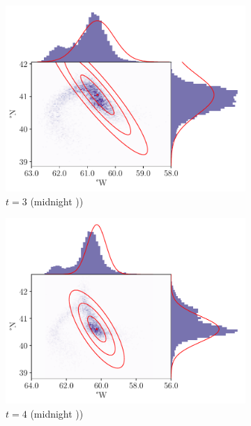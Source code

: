 \begin{figure}
\begin{center}
\begin{subfigure}{0.49\textwidth}
			\includegraphics[width=\textwidth]{chp06_applications/figures/gulf_stream/traj_stoch_em_3.0}
			\caption{\(t = 3\) (midnight ))}
			\label{fig:natl_em_3}
		\end{subfigure}
		\begin{subfigure}{0.49\textwidth}
			\includegraphics[width=\textwidth]{chp06_applications/figures/gulf_stream/traj_stoch_em_4.0}
			\caption{\(t = 4\) (midnight ))}
		\end{subfigure}
		\begin{subfigure}{0.49\textwidth}

\end{subfigure}
\end{center}
\end{figure}

